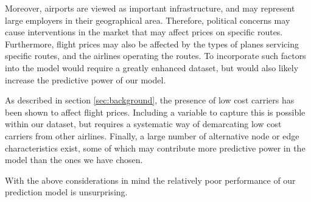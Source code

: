Moreover, airports are viewed as important infrastructure, and may represent large employers in their geographical area. Therefore, political concerns may cause interventions in the market that may affect prices on specific routes. Furthermore, flight prices may also be affected by the types of planes servicing specific routes, and the airlines operating the routes. To incorporate such factors into the model would require a greatly enhanced dataset, but would also likely increase the predictive power of our model.

As described in section \ref{sec:background}, the presence of low cost carriers has been shown to affect flight prices. Including a variable to capture this is possible within our dataset, but requires a systematic way of demarcating low cost carriers from other airlines. 
Finally, a large number of alternative node or edge characteristics exist, some of which may contribute more predictive power in the model than the ones we have chosen. 

With the above considerations in mind the relatively poor performance of our prediction model is unsurprising. 


